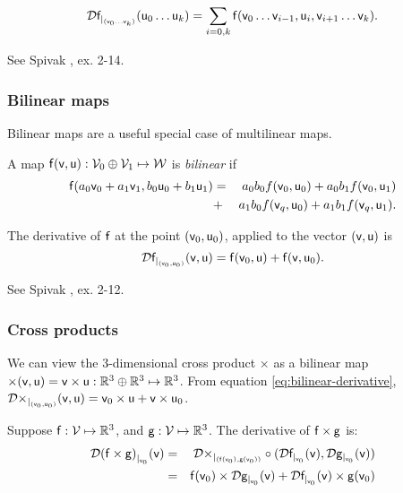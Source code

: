 \begin{equation}
\Dc{\f}{(\v_0 \ldots \v_k)}{\u_0 \ldots \u_k}
 =  \sum_{i=0,k} \f(\v_0 \ldots \v_{i-1},\u_i,\v_{i+1} \ldots \v_k).
\end{equation}

See Spivak \cite{spivak-1965}, ex. 2-14.



\subsubsection{Bilinear maps}
\label{sec:Bilinear-maps}

Bilinear maps are a useful special case of multilinear maps.

A map $\f(\v,\u):\Vspace_0 \oplus \Vspace_1 \mapsto \Wspace$
is {\it bilinear} if
\begin{eqnarray}
\f(a_0 \v_0 + a_1 \v_1, b_0 \u_0 + b_1 \u_1)
& =  & a_0 b_0 f(\v_0,\u_0)
+  a_0 b_1 f(\v_0,\u_1)
\\
& +  & a_1 b_0 f(\v_q,\u_0)
 +  a_1 b_1 f(\v_q,\u_1).
\nonumber
\end{eqnarray}

The derivative of $\f$
at the point $(\v_0,\u_0)$, applied to the vector $(\v,\u)$ is
\begin{equation}
\label{eq:bilinear-derivative}
\Dc{\f}{(\v_0,\u_0)}{\v,\u} = \f(\v_0,\u) + \f(\v,\u_0).
\end{equation}

See Spivak \cite{spivak-1965}, ex. 2-12.



\subsubsection{Cross products}
\label{sec:cross-products}

We can view the 3-dimensional cross product
$ \times $
as a bilinear map
$\times(\v,\u) = \v \times \u : \Reals^3 \oplus \Reals^3 \mapsto \Reals^3$.
From equation \ref{eq:bilinear-derivative},
$\Dc{\times}{(\v_0,\u_0)}{\v,\u} = \v_0 \times \u + \v \times \u_0$.

Suppose
$\f:\Vspace \mapsto \Reals^3$, and
$\g:\Vspace \mapsto \Reals^3$.
The derivative of $\f \times \g$ is:
\begin{eqnarray}
\Dc{(\f \times \g)}{\v_0}{\v}
& =
& \Db{\times}{(\f(\v_0),\g(\v_0))} \circ (\Dc{\f}{\v_0}{\v}, \Dc{\g}{\v_0}{\v})
\\
& =
& \f(\v_0) \times \Dc{\g}{\v_0}{\v} + \Dc{\f}{\v_0}{\v} \times \g(\v_0) \nonumber
\end{eqnarray}

